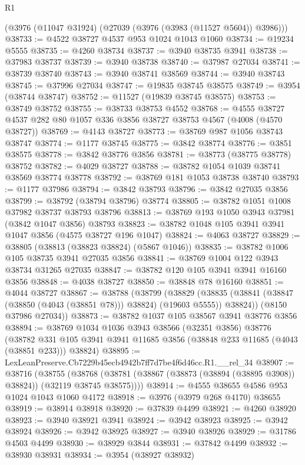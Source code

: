\begin{lexlean}{R1}
\begin{coremodule}
    (@3976 (@11047 @31924) (@27039 (@3976 (@3983 (@11527 @5604)) @3986)))
@38733 := @4522 @38727 @4537 @953 @1024 @1043 @1060
@38734 := @19234 @5555
@38735 := @4260 @38734
@38737 := @3940 @38735 @3941
@38738 := @37983 @38737
@38739 := @3940 @38738
@38740 := @37987 @27034
@38741 := @38739 @38740
@38743 := @3940 @38741 @38569
@38744 := @3940 @38743
@38745 := @37996 @27034
@38747 := @19835 @38745 @38575
@38749 := @3954 (@38744 @38747)
@38752 := @11527 (@19839 @38745 @38575)
@38753 := @38749 @38752
@38755 := @38733 @38753 @4552
@38768 := @4555 @38727 @4537 @282 @80 @1057 @336 @3856 @38727 @38753 @4567 (@4008 (@4570 @38727))
@38769 := @4143 @38727
@38773 := @38769 @987 @1056 @38743 @38747
@38774 := @1177 @38745
@38775 := @3842 @38774
@38776 := @3851 @38575
@38778 := @3842 @38776 @3856
@38781 := @38773 (@38775 @38778) @38752
@38782 := @4029 @38727
@38788 := @38782 @1054 @1039 @38741 @38569 @38774 @38778
@38792 := @38769 @181 @1053 @38738 @38740
@38793 := @1177 @37986
@38794 := @3842 @38793
@38796 := @3842 @27035 @3856
@38799 := @38792 (@38794 @38796) @38774
@38805 := @38782 @1051 @1008 @37982 @38737 @38793 @38796
@38813 := @38769 @193 @1050 @3943 @37981 (@3842 @1047 @3856) @38793
@38823 := @38782 @1048 @105 @3941 @3941 @1047 @3856 (@4575 @38727 @196 @1047)
@38824 := @4063 @38727
@38829 := @38805 (@38813 (@38823 @38824) (@5867 @1046))
@38835 := @38782 @1006 @105 @38735 @3941 @27035 @3856
@38841 := @38769 @1004 @122 @3943 @38734 @31265 @27035
@38847 := @38782 @120 @105 @3941 @3941 @16160 @3856
@38848 := @4038 @38727
@38850 := @38848 @78 @16160
@38851 := @4044 @38727
@38867 := @38788
    (@38799
      (@38829 (@38835 (@38841 (@38847 (@38850 (@4043 (@38851 @78))) @38824) (@19603 @5555)) @38824))
      (@8150 @37986 @27034))
@38873 := @38782 @1037 @105 @38567 @3941 @38776 @3856
@38894 := @38769
    @1034
    @1036
    @3943
    @38566
    (@32351 @3856)
    @38776
    (@38782 @331 @105 @3941 @3941 @11685 @3856 (@38848 @233 @11685 (@4043 (@38851 @233))) @38824)
@38895 := LexLeanPreserve.Cb7229b45ecb4942b7ff7d7be4f6d46cc.R1.__rel_34
@38907 := @38716
    (@38755
      (@38768 (@38781 (@38867 (@38873 (@38894 (@38895 @3908)) @38824)) (@32119 @38745 @38575))))
@38914 := @4555 @38655 @4586 @953 @1024 @1043 @1060 @4172
@38918 := @3976 (@3979 @268 @4170) @38655
@38919 := @38914 @38918
@38920 := @37839 @4499
@38921 := @4260 @38920
@38923 := @3940 @38921 @3941
@38924 := @3942 @38923
@38925 := @3942 @38924
@38926 := @3942 @38925
@38927 := @3940 @38926
@38929 := @31786 @4503 @4499
@38930 := @38929 @3844
@38931 := @37842 @4499
@38932 := @38930 @38931
@38934 := @3954 (@38927 @38932)

\end{coremodule}
\end{lexlean}
